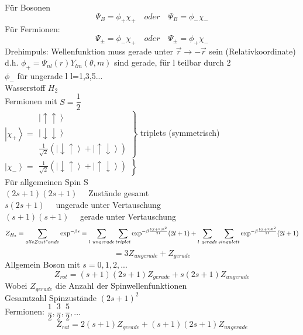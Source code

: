 Für Bosonen $$ \Psi_B = \phi_+ \chi_+ \quad oder \quad \Psi_B = \phi_-\chi_- $$
Für Fermionen: $$ \Psi_\pm = \phi_- \chi_+ \quad oder \quad \Psi_\pm = \phi_+\chi_-$$
Drehimpuls: Wellenfunktion muss gerade unter $ \vec{r} \rightarrow - \vec{r} $ sein (Relativkoordinate)\\
d.h. $\phi_+ = \Psi_{nl}(r) Y_{lm}(\theta, m)$ sind gerade, für l teilbar durch 2 \\[1.5ex]
$\phi_- $ für ungerade l l=1,3,5... \\[2ex]
Wasserstoff $H_2$ \\[1.5ex]
Fermionen mit $S=\dfrac{1}{2}$ \\[1.5ex]
$\left| \chi_+ \right\rangle = \left. \begin{array}{c} 
\left| \uparrow \uparrow \right\rangle \\
\left| \downarrow \downarrow \right\rangle \\
\frac{1}{\sqrt{2}} (\left| \downarrow \uparrow \right\rangle + \left| \uparrow \downarrow \right\rangle )

\end{array} \right\rbrace $ triplets (symmetrisch) \\
$\left| \chi_- \right\rangle = \left. \begin{array}{c} \frac{1}{\sqrt{2}} (\left| \downarrow \uparrow \right\rangle + \left| \uparrow \downarrow \right\rangle ) \end{array} \right\rbrace $ \\[1.5ex]
Für allgemeinen Spin S \\
$(2s+1)(2s+1) \quad $ Zustände gesamt \\[1.5ex]
$s(2s+1) \quad$ ungerade unter Vertauschung\\[1.5ex]
$(s+1)(s+1) \quad $ gerade unter Vertauschung \\[2ex]
$$Z_{H_2} = \sum \limits _{alle Zust"ande} \exp ^{-\beta \epsilon } = \sum \limits _{l\ ungerade} \sum \limits _ {triplet} \exp^{-\beta \frac{l(l+1)\hbar^2}{2I}}(2l+1) + \sum \limits _{l\ gerade} \sum \limits _ {singulett} \exp^{-\beta \frac{l(l+1)\hbar^2}{2I}}(2l+1)$$ $$ = 3 Z_{ungerade} + Z_{gerade}$$
Allgemein Boson mit $ s= 0,1,2,...$ 
$$ Z_{rot} = (s+1)(2s+1) Z_{gerade} + s(2s+1) Z_{ungerade} $$ Wobei $Z_{gerade}$ die Anzahl der Spinwellenfunktionen \\[1.5ex]
Gesamtzahl Spinzustände $(2s+1)^2$ \\[1.5ex]
Fermionen: $\dfrac{1}{2},\dfrac{3}{2},\dfrac{5}{2}, ...$
$$Z_{rot} = 2(s+1)Z_{gerade} + (s+1)(2s+1) Z_{ungerade} $$ 
